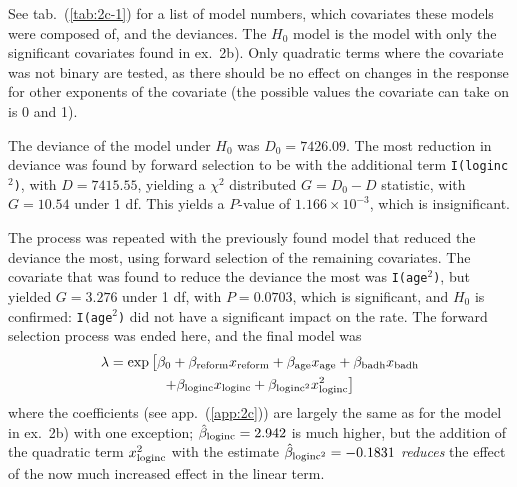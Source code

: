 \documentclass[a4paper,11pt]{article}
\begin{document}
\begin{enumerate}[label=2\alph*)]
        See tab.~(\ref{tab:2c-1}) for a list of model numbers, which covariates these models were composed of, and the deviances. The $H_0$ model is the model with only the significant covariates found in ex.~2b). Only quadratic terms where the covariate was not binary are tested, as there should be no effect on changes in the response for other exponents of the covariate (the possible values the covariate can take on is 0 and 1).
        
        The deviance of the model under $H_0$ was $D_0 = 7426.09$. The most reduction in deviance was found by forward selection to be with the additional term \texttt{I(loginc$^2$)}, with $D = 7415.55$, yielding a $\chi^2$ distributed $G = D_0 - D$ statistic, with $G = 10.54$ under 1 df. This yields a $P$-value of $1.166 \times 10^{-3}$, which is insignificant.

        The process was repeated with the previously found model that reduced the deviance the most, using forward selection of the remaining covariates. The covariate that was found to reduce the deviance the most was \texttt{I(age$^2$)}, but yielded $G = 3.276$ under 1 df, with $P = 0.0703$, which is significant, and $H_0$ is confirmed: \texttt{I(age$^2$)} did not have a significant impact on the rate. The forward selection process was ended here, and the final model was
        \begin{multline}
            \lambda = \exp\big[ \beta_0 + \beta_{\rm reform} x_{\rm reform} + \beta_{\rm age} x_{\rm age} + \beta_{\rm badh} x_{\rm badh} \\
            + \beta_{\rm loginc} x_{\rm loginc} + \beta_{\rm loginc^2} x_{\rm loginc}^2 \big]
            \label{eq:poissonmodel}
        \end{multline}
        where the coefficients (see app.~(\ref{app:2c})) are largely the same as for the model in ex.~2b) with one exception; $\hat{\beta}_{\rm loginc} = 2.942$ is much higher, but the addition of the quadratic term $x_{\rm loginc}^2$ with the estimate $\hat{\beta}_{\rm loginc^2} = -0.1831$ \textit{reduces} the effect of the now much increased effect in the linear term.


\end{enumerate}
\end{document}
